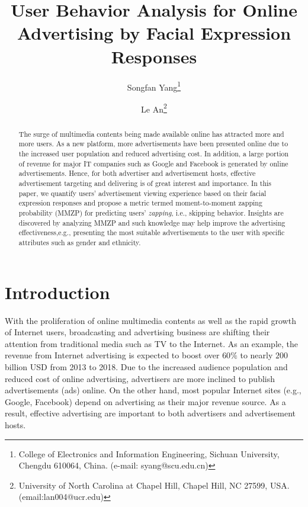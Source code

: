 \documentclass[twoside,leqno,twocolumn]{article}
\begin{document}

\title{\Large User Behavior Analysis for Online Advertising by Facial Expression Responses}
\author{Songfan Yang\thanks{College of Electronics and Information Engineering,
Sichuan University, Chengdu 610064, China. (e-mail: syang@scu.edu.cn)} \\
\and
Le An\thanks{University of North Carolina at Chapel Hill, Chapel Hill, NC 27599, USA. (email:lan004@ucr.edu)}}
\date{}

\maketitle



\begin{abstract} \small\baselineskip=9pt The surge of multimedia contents being made available online has attracted more and more users. As a new platform, more advertisements have been presented online due to the increased user population and reduced advertising cost. In addition, a large portion of revenue for major IT companies such as Google and Facebook is generated by online advertisements. Hence, for both advertiser and advertisement hosts, effective advertisement targeting and delivering is of great interest and importance. In this paper, we quantify users' advertisement viewing experience based on their facial expression responses and propose a metric termed moment-to-moment zapping probability (MMZP) for predicting users' \textit{zapping}, i.e., skipping behavior. Insights are discovered by analyzing MMZP and such knowledge may help improve the advertising effectiveness,e.g., presenting the most suitable advertisements to the user with specific attributes such as gender and ethnicity.\end{abstract}

\section{Introduction}
With the proliferation of online multimedia contents as well as the rapid growth of Internet users, broadcasting and advertising business are shifting their attention from traditional media such as TV to the Internet. As an example, the revenue from Internet advertising is expected to boost over $60\%$ to nearly $200$ billion USD from 2013 to 2018. Due to the increased audience population and reduced cost of online advertising, advertisers are more inclined to publish advertisements (ads) online. On the other hand, most popular Internet sites (e.g., Google, Facebook) depend on advertising as their major revenue source. As a result, effective advertising are important to both advertisers and advertisement hosts.
\end{document}
